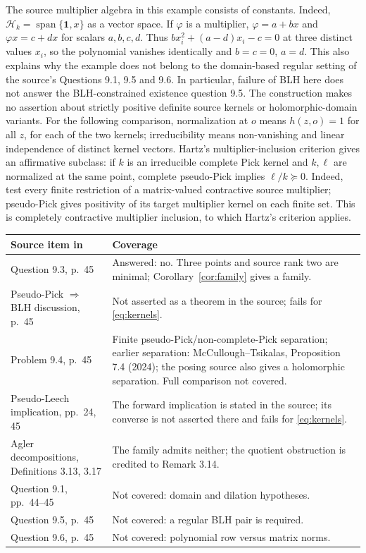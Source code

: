 \documentclass[11pt]{article}
\newcommand{\psd}{\succeq0}
\newcommand{\HH}{\mathcal H}
\begin{document}
The source multiplier algebra in this example consists of constants.
Indeed, $\HH_k=\operatorname{span}\{\mathbf1,x\}$ as a vector space.
If $\varphi$ is a multiplier, $\varphi=a+bx$ and
$\varphi x=c+dx$ for scalars $a,b,c,d$. Thus
$bx_i^2+(a-d)x_i-c=0$ at three distinct values $x_i$, so the polynomial
vanishes identically and $b=c=0$, $a=d$. This also explains why the
example does not belong to the domain-based regular setting of the
source's Questions 9.1, 9.5 and 9.6. In particular, failure of BLH here
does not answer the BLH-constrained existence question 9.5.
The construction makes no assertion about strictly positive definite
source kernels or holomorphic-domain variants.
For the following comparison, normalization at $o$ means $h(z,o)=1$
for all $z$, for each of the two kernels; irreducibility means
non-vanishing and linear independence of distinct kernel vectors.
Hartz's multiplier-inclusion criterion \cite[Corollary 3.5]{Hartz}
gives an affirmative subclass: if $k$ is an irreducible complete
Pick kernel and $k,\ell$ are normalized at the same point, complete
pseudo-Pick implies $\ell/k\psd$. Indeed, test every finite restriction
of a matrix-valued contractive source multiplier; pseudo-Pick gives
positivity of its target multiplier kernel on each finite set. This
is completely contractive multiplier inclusion, to which Hartz's
criterion applies.

\begin{center}
\small
\begin{tabular}{p{}p{}}
\toprule
Source item in \cite{LMT} & Coverage\\
\midrule
Question 9.3, p.~45 & Answered: no. Three points and source rank two
are minimal; Corollary~\ref{cor:family} gives a family.\\
Pseudo-Pick $\Rightarrow$ BLH discussion, p.~45 & Not asserted as a
theorem in the source; fails for \eqref{eq:kernels}.\\
Problem 9.4, p.~45 & Finite pseudo-Pick/non-complete-Pick separation;
earlier separation: McCullough--Tsikalas, Proposition 7.4 (2024);
the posing source also gives a holomorphic separation. Full comparison
not covered.\\
Pseudo-Leech implication, pp.~24, 45 & The forward implication is stated
in the source; its converse is not asserted there and fails
for \eqref{eq:kernels}.\\
Agler decompositions, Definitions 3.13, 3.17 & The family admits neither;
the quotient obstruction is credited to Remark 3.14.\\
Question 9.1, pp.~44--45 & Not covered: domain and dilation hypotheses.\\
Question 9.5, p.~45 & Not covered: a regular BLH pair is required.\\
Question 9.6, p.~45 & Not covered: polynomial row versus matrix norms.\\
\bottomrule
\end{tabular}
\end{center}
\end{document}
